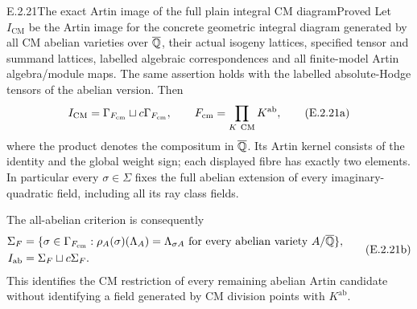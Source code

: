 \begin{result}{E.2.21}{The exact Artin image of the full plain integral CM diagram}{Proved}
Let \(I_{\mathrm{CM}}\) be the Artin image for the concrete
geometric integral diagram generated by all CM abelian varieties
over \(\overline{\mathbb Q}\), their actual isogeny lattices, specified tensor
and summand lattices, labelled algebraic correspondences and
all finite-model Artin algebra/module maps. The same assertion
holds with the labelled absolute-Hodge tensors of the abelian
version. Then
\[
 I_{\mathrm{CM}}
   =\Gamma_{F_{\mathrm{cm}}}\sqcup
        c\Gamma_{F_{\mathrm{cm}}},
 \qquad
 F_{\mathrm{cm}}=\prod_{K\ {\rm CM}}K^{\mathrm{ab}},
 \tag{E.2.21a}
\]
where the product denotes the compositum in \(\overline{\mathbb Q}\).
Its Artin kernel consists of the identity and the global
weight sign; each displayed fibre has exactly two elements.
In particular every \(\sigma\in\Sigma\) fixes the full
abelian extension of every imaginary-quadratic field,
including all its ray class fields.

The all-abelian criterion is consequently
\[
 \begin{split}
 \Sigma_F
  &=\{\sigma\in\Gamma_{F_{\mathrm{cm}}}:
       \rho_A(\sigma)(\Lambda_A)=\Lambda_{\sigma A}
       \text{ for every abelian variety }A/\overline{\mathbb Q}\},\\
 I_{\mathrm{ab}}&=\Sigma_F\sqcup c\Sigma_F .
 \end{split}
 \tag{E.2.21b}
\]
This identifies the CM restriction of every remaining
abelian Artin candidate without identifying a field
generated by CM division points with \(K^{\mathrm{ab}}\).
\end{result}
